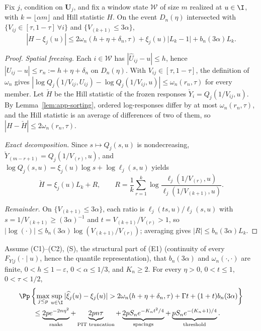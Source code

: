 \begin{lemma}\label{lem:app-hill}
Fix $j$, condition on $\bm U_j$, and fix a window state $\mathcal W$ of
size $m$ realized at $u\in\I$, with $k=\lfloor\alpha m\rfloor$ and Hill
statistic $H$.  On the event $D_n(\eta)$ intersected with
$\{V_{ij}\in[\tau,1-\tau]\ \forall i\}$ and $\{V_{(k+1)}\le3\alpha\}$,
\begin{equation}
 |H-\xi_j(u)|
 \le2\omega_n(h+\eta+\delta_n,\tau)+\xi_j(u)|L_k-1|+b_n(3\alpha)L_k.
 \label{eq:A3app}
\end{equation}
\end{lemma}

\begin{proof}
\emph{Spatial freezing.}  Each $i\in\mathcal W$ has
$|\widehat U_{ij}-u|\le h$, hence $|U_{ij}-u|\le r_n:=h+\eta+\delta_n$ on
$D_n(\eta)$.  With $V_{ij}\in[\tau,1-\tau]$, the definition of
$\omega_n$ gives
$|\log Q_j(1/V_{ij},U_{ij})-\log Q_j(1/V_{ij},u)|\le\omega_n(r_n,\tau)$
for every member.  Let $\check H$ be the Hill statistic of the frozen
responses $\check Y_i=Q_j(1/V_{ij},u)$.  By Lemma~\ref{lem:app-sorting},
ordered log-responses differ by at most $\omega_n(r_n,\tau)$, and the Hill
statistic is an average of differences of two of them, so
$|H-\check H|\le2\omega_n(r_n,\tau)$.

\emph{Exact decomposition.}  Since $s\mapsto Q_j(s,u)$ is nondecreasing,
$\check Y_{(m-r+1)}=Q_j(1/V_{(r)},u)$, and
$\log Q_j(s,u)=\xi_j(u)\log s+\log\ell_j(s,u)$ yields
\[
 \check H=\xi_j(u)L_k+R,
 \qquad
 R=\frac1k\sum_{r=1}^k
 \log\frac{\ell_j(1/V_{(r)},u)}{\ell_j(1/V_{(k+1)},u)}.
\]

\emph{Remainder.}  On $\{V_{(k+1)}\le3\alpha\}$, each ratio is
$\ell_j(ts,u)/\ell_j(s,u)$ with $s=1/V_{(k+1)}\ge(3\alpha)^{-1}$ and
$t=V_{(k+1)}/V_{(r)}>1$, so
$|\log(\cdot)|\le b_n(3\alpha)\log(V_{(k+1)}/V_{(r)})$; averaging gives
$|R|\le b_n(3\alpha)L_k$.
\end{proof}

\begin{theorem}
\label{thm:app-rank-profile}
Assume (C1)--(C2), (S), the structural part of (E1) (continuity of
every $F_{Y|j}(\cdot\mid u)$, hence the quantile representation), that
$b_n(3\alpha)$ and $\omega_n(\cdot,\cdot)$ are finite,
$0<h\le1-\varepsilon$, $0<\alpha\le1/3$, and $K_n\ge2$.  For every
$\eta>0$, $0<t\le1$, $0<\tau<1/2$,
\begin{align}
&\Pp\left\{\max_{j\le p}\sup_{u\in\I}
 |\widehat\xi_j(u)-\xi_j(u)|
 >2\omega_n(h+\eta+\delta_n,\tau)+\Gamma t+(1+t)b_n(3\alpha)\right\}
 \nonumber\\
&\qquad\le
 \underbrace{2pe^{-2n\eta^2}}_{\text{ranks}}
 +\underbrace{2pn\tau}_{\text{PIT truncation}}
 +\underbrace{2pS_ne^{-K_nt^2/4}}_{\text{spacings}}
 +\underbrace{pS_ne^{-(K_n+1)/4}}_{\text{threshold}}.
 \label{eq:A4app}
\end{align}
\end{theorem}

